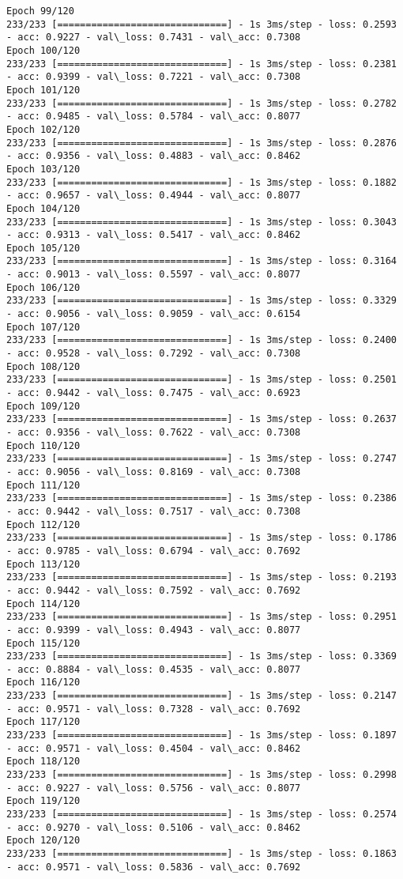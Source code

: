 \documentclass[11pt]{article}
\begin{document}
\begin{Verbatim}[commandchars=\\\{\}]
Epoch 99/120
233/233 [==============================] - 1s 3ms/step - loss: 0.2593 - acc: 0.9227 - val\_loss: 0.7431 - val\_acc: 0.7308
Epoch 100/120
233/233 [==============================] - 1s 3ms/step - loss: 0.2381 - acc: 0.9399 - val\_loss: 0.7221 - val\_acc: 0.7308
Epoch 101/120
233/233 [==============================] - 1s 3ms/step - loss: 0.2782 - acc: 0.9485 - val\_loss: 0.5784 - val\_acc: 0.8077
Epoch 102/120
233/233 [==============================] - 1s 3ms/step - loss: 0.2876 - acc: 0.9356 - val\_loss: 0.4883 - val\_acc: 0.8462
Epoch 103/120
233/233 [==============================] - 1s 3ms/step - loss: 0.1882 - acc: 0.9657 - val\_loss: 0.4944 - val\_acc: 0.8077
Epoch 104/120
233/233 [==============================] - 1s 3ms/step - loss: 0.3043 - acc: 0.9313 - val\_loss: 0.5417 - val\_acc: 0.8462
Epoch 105/120
233/233 [==============================] - 1s 3ms/step - loss: 0.3164 - acc: 0.9013 - val\_loss: 0.5597 - val\_acc: 0.8077
Epoch 106/120
233/233 [==============================] - 1s 3ms/step - loss: 0.3329 - acc: 0.9056 - val\_loss: 0.9059 - val\_acc: 0.6154
Epoch 107/120
233/233 [==============================] - 1s 3ms/step - loss: 0.2400 - acc: 0.9528 - val\_loss: 0.7292 - val\_acc: 0.7308
Epoch 108/120
233/233 [==============================] - 1s 3ms/step - loss: 0.2501 - acc: 0.9442 - val\_loss: 0.7475 - val\_acc: 0.6923
Epoch 109/120
233/233 [==============================] - 1s 3ms/step - loss: 0.2637 - acc: 0.9356 - val\_loss: 0.7622 - val\_acc: 0.7308
Epoch 110/120
233/233 [==============================] - 1s 3ms/step - loss: 0.2747 - acc: 0.9056 - val\_loss: 0.8169 - val\_acc: 0.7308
Epoch 111/120
233/233 [==============================] - 1s 3ms/step - loss: 0.2386 - acc: 0.9442 - val\_loss: 0.7517 - val\_acc: 0.7308
Epoch 112/120
233/233 [==============================] - 1s 3ms/step - loss: 0.1786 - acc: 0.9785 - val\_loss: 0.6794 - val\_acc: 0.7692
Epoch 113/120
233/233 [==============================] - 1s 3ms/step - loss: 0.2193 - acc: 0.9442 - val\_loss: 0.7592 - val\_acc: 0.7692
Epoch 114/120
233/233 [==============================] - 1s 3ms/step - loss: 0.2951 - acc: 0.9399 - val\_loss: 0.4943 - val\_acc: 0.8077
Epoch 115/120
233/233 [==============================] - 1s 3ms/step - loss: 0.3369 - acc: 0.8884 - val\_loss: 0.4535 - val\_acc: 0.8077
Epoch 116/120
233/233 [==============================] - 1s 3ms/step - loss: 0.2147 - acc: 0.9571 - val\_loss: 0.7328 - val\_acc: 0.7692
Epoch 117/120
233/233 [==============================] - 1s 3ms/step - loss: 0.1897 - acc: 0.9571 - val\_loss: 0.4504 - val\_acc: 0.8462
Epoch 118/120
233/233 [==============================] - 1s 3ms/step - loss: 0.2998 - acc: 0.9227 - val\_loss: 0.5756 - val\_acc: 0.8077
Epoch 119/120
233/233 [==============================] - 1s 3ms/step - loss: 0.2574 - acc: 0.9270 - val\_loss: 0.5106 - val\_acc: 0.8462
Epoch 120/120
233/233 [==============================] - 1s 3ms/step - loss: 0.1863 - acc: 0.9571 - val\_loss: 0.5836 - val\_acc: 0.7692

    \end{Verbatim}
\end{document}
